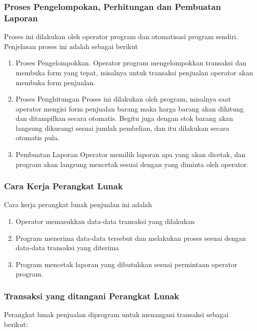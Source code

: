 \documentclass{article}
\begin{document}
\subsubsection{Proses Pengelompokan, Perhitungan dan Pembuatan Laporan}
Proses ini dilakukan oleh operator program dan otomatisasi program sendiri. Penjelasan proses ini adalah sebagai berikut 
\begin{enumerate}
    \item Proses Pengelompokkan.\newline
    Operator program mengelompokkan transaksi dan membuka form yang tepat, misalnya untuk transaksi penjualan operator akan membuka form penjualan.
    \item Proses Penghitungan\newline
    Proses ini dilakukan oleh program, misalnya saat operator mengisi form penjualan barang maka harga barang akan dihitung dan ditampilkan secara otomatis. Begitu juga dengan stok barang akan langsung dikurangi sesuai jumlah pembelian, dan itu dilakukan secara otomatis pula.
    \item Pembuatan Laporan \newline
    Operator memilih laporan apa yang akan dicetak, dan program akan langsung mencetak sesuai dengan yang diminta oleh operator.
\end{enumerate}

\subsubsection{Cara Kerja Perangkat Lunak}
Cara kerja perangkat lunak penjualan ini adalah
\begin{enumerate}
    \item Operator memasukkan data-data transaksi yang dilakukan
    \item Program menerima data-data tersebut dan melakukan proses sesuai dengan data-data transaksi yang diterima
    \item Program mencetak laporan yang dibutuhkan sesuai permintaan operator program.
\end{enumerate}

\subsubsection{Transaksi yang ditangani Perangkat Lunak}
Perangkat lunak penjualan diprogram untuk menangani transaksi sebagai berikut:
\end{document}
